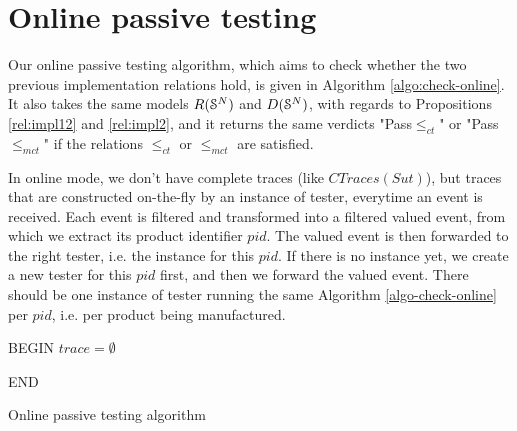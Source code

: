 \section{Online passive testing}
\label{sec:testing:online}

Our online passive testing algorithm, which aims to check whether
the two previous implementation relations hold, is given in
Algorithm \ref{algo:check-online}. It also takes the same models
$R(\EuScript{S}^{N})$ and $D(\EuScript{S}^{N})$, with regards to
Propositions \ref{rel:impl12} and \ref{rel:impl2}, and it returns
the same verdicts "Pass$\leq_{ct}$" or "Pass$\leq_{mct}$" if the
relations $\leq_{ct}$ or $\leq_{mct}$ are satisfied.

In online mode, we don't have complete traces (like
$CTraces({Sut})$), but traces that are constructed on-the-fly by
an instance of tester, everytime an event is received. Each event
is filtered and transformed into a filtered valued event, from
which we extract its product identifier $pid$. The valued event
is then forwarded to the right tester, i.e. the instance for this
$pid$. If there is no instance yet, we create a new tester for
this $pid$ first, and then we forward the valued event. There
should be one instance of tester running the same Algorithm
\ref{algo-check-online} per $pid$, i.e. per product being
manufactured.



\begin{algorithm}[h]


    BEGIN\;
    $trace = \emptyset$\;


    END\;

    \caption{Online passive testing algorithm}
    \label{algo:check-online}
\end{algorithm}
